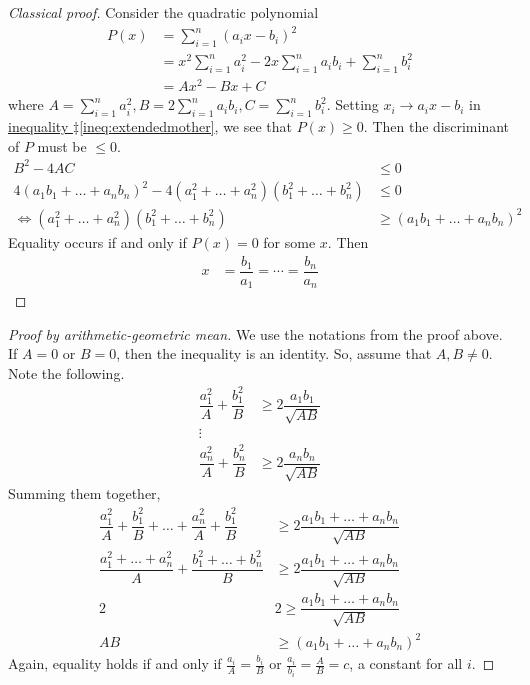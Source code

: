 \documentclass{subfile}
\begin{document}
		\begin{proof}[Classical proof]
			Consider the quadratic polynomial
				\begin{align*}
					P(x)
						& = \sum_{i=1}^n(a_ix-b_i)^2\\
						& = x^2\sum_{i=1}^na_i^2-2x\sum_{i=1}^na_ib_i+\sum_{i=1}^nb_i^2\\
						& = Ax^2-Bx+C
				\end{align*}
			where $A=\sum_{i=1}^na_i^2,B=2\sum_{i=1}^na_ib_i,C=\sum_{i=1}^nb_i^2$. Setting $x_i\to a_ix-b_i$ in \hyperref[ineq:extendedmother]{inequality $\ddagger$\ref{ineq:extendedmother}}, we see that $P(x)\geq0$. Then the discriminant of $P$ must be $\leq0$.
				\begin{align*}
					B^2-4AC
						& \leq0\\
					4(a_1b_1+\ldots+a_nb_n)^2-4(a_1^2+\ldots+a_n^2)(b_1^2+\ldots+b_n^2)
						& \leq0\\
					\iff (a_1^2+\ldots+a_n^2)(b_1^2+\ldots+b_n^2)
						& \geq(a_1b_1+\ldots+a_nb_n)^2
				\end{align*}
			Equality occurs if and only if $P(x)=0$ for some $x$. Then
				\begin{align*}
					x
						& = \dfrac{b_1}{a_1}=\cdots=\dfrac{b_n}{a_n}
				\end{align*}
		\end{proof}
	
		\begin{proof}[Proof by arithmetic-geometric mean]
			We use the notations from the proof above. If $A=0$ or $B=0$, then the inequality is an identity. So, assume that $A,B\neq0$. Note the following.
				\begin{align*}
					\dfrac{a_1^2}{A}+\dfrac{b_1^2}{B}
						& \geq2\dfrac{a_1b_1}{\sqrt{AB}}\\
					\vdots\\
					\dfrac{a_n^2}{A}+\dfrac{b_n^2}{B}
						& \geq2\dfrac{a_nb_n}{\sqrt{AB}}
				\end{align*}
			Summing them together,
				\begin{align*}
					\dfrac{a_1^2}{A}+\dfrac{b_1^2}{B}+\ldots+\dfrac{a_n^2}{A}+\dfrac{b_1^2}{B}
						& \geq2\dfrac{a_1b_1+\ldots+a_nb_n}{\sqrt{AB}}\\
					\dfrac{a_1^2+\ldots+a_n^2}{A}+\dfrac{b_1^2+\ldots+b_n^2}{B}
						& \geq2\dfrac{a_1b_1+\ldots+a_nb_n}{\sqrt{AB}}\\
					2
						& 2\geq\dfrac{a_1b_1+\ldots+a_nb_n}{\sqrt{AB}}\\
					AB
						& \geq\left(a_1b_1+\ldots+a_nb_n\right)^2
				\end{align*}
			Again, equality holds if and only if $\frac{a_i}{A}=\frac{b_i}{B}$ or $\frac{a_i}{b_i}=\frac{A}{B}=c$, a constant for all $i$.
		\end{proof}
	
\end{document}
